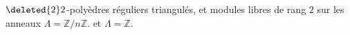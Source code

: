 $\deleted{2}2$-polyèdres réguliers triangulés, et modules libres de rang $2$ sur les anneaux $\Lambda=\mathbb{Z}/n\mathbb{Z}$. et $\Lambda=\mathbb{Z}$.
